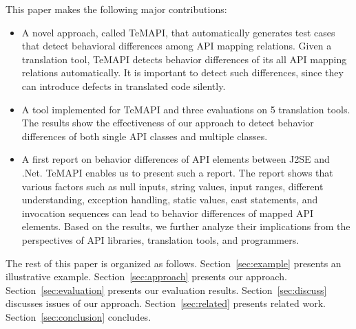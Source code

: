 This paper makes the following major contributions:

\begin{itemize}\vspace*{-1.5ex}
\item A novel approach, called TeMAPI, that automatically generates test cases that detect behavioral differences among API mapping relations. Given a translation tool, TeMAPI detects behavior differences of its all API mapping relations automatically. It is important to detect such differences, since they can introduce defects in translated code silently.\vspace*{-1.5ex}
\item A tool implemented for TeMAPI and three evaluations on 5 translation tools. The results show the effectiveness of our approach to detect behavior differences of both single API classes and multiple classes.\vspace*{-1.5ex}
\item A first report on behavior differences of API elements between J2SE and .Net. TeMAPI enables us to present such a report. The report shows that various factors such as null inputs, string values, input ranges, different understanding, exception handling, static values, cast statements, and invocation sequences can lead to behavior differences of mapped API elements. Based on the results, we further analyze their implications from the perspectives of API libraries, translation tools, and programmers.
\end{itemize}\vspace*{-1.5ex}

The rest of this paper is organized as follows.
Section~\ref{sec:example} presents an illustrative example.
Section~\ref{sec:approach} presents our approach.
Section~\ref{sec:evaluation} presents our evaluation results.
Section~\ref{sec:discuss} discusses issues of our approach.
Section~\ref{sec:related} presents related work.
Section~\ref{sec:conclusion} concludes.



